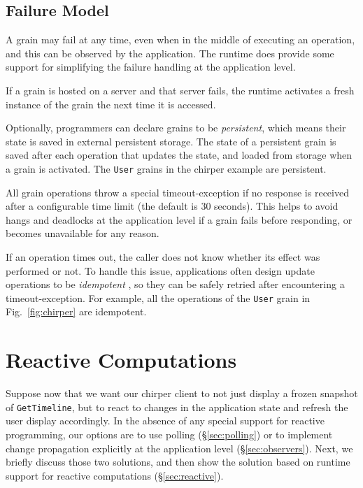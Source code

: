 \subsection{Failure Model}

A grain may fail at any time, even when in the middle of executing an operation, and this can be observed by the application. The runtime does provide some support for simplifying the failure handling at the application level. 

 If a grain is hosted on a server and that server fails, the runtime activates a fresh instance of the grain the next time it is accessed. 

 Optionally, programmers can declare grains to be \emph{persistent}, which means their state is saved in external persistent storage. The state of a persistent grain is saved after each operation that updates the state, and loaded from storage when a grain is activated. The \lstinline|User| grains in the chirper example are persistent. 

 All grain operations throw a special timeout-exception if no response is received after a configurable time limit (the default is 30 seconds). This helps to avoid hangs and deadlocks at the application level if a grain fails before responding, or becomes unavailable for any reason.

If an operation times out, the caller does not know whether its effect was performed or not. To handle this issue, applications often design update operations to be \emph{idempotent} \cite{kapil}, so they can be safely retried after encountering a timeout-exception. For example, all the operations of the \lstinline|User| grain in Fig.~\ref{fig:chirper} are idempotent.

\section{Reactive Computations}\label{sec:formulation}

Suppose now that we want our chirper client to not just display a frozen snapshot of \lstinline|GetTimeline|, but to react to changes in the application state and refresh the user display accordingly. In the absence of any special support for reactive programming, our options are to use polling (\S\ref{sec:polling}) or to implement change propagation explicitly at the application level (\S\ref{sec:observers}). Next, we briefly discuss those two solutions, and then show the solution based on runtime support for reactive computations (\S\ref{sec:reactive}). 

